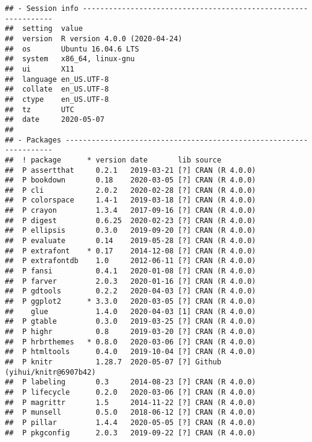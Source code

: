 \documentclass[ngerman,a4paper,]{scrartcl}
\begin{document}
\begin{verbatim}
## - Session info ---------------------------------------------------------------
##  setting  value                       
##  version  R version 4.0.0 (2020-04-24)
##  os       Ubuntu 16.04.6 LTS          
##  system   x86_64, linux-gnu           
##  ui       X11                         
##  language en_US.UTF-8                 
##  collate  en_US.UTF-8                 
##  ctype    en_US.UTF-8                 
##  tz       UTC                         
##  date     2020-05-07                  
## 
## - Packages -------------------------------------------------------------------
##  ! package      * version date       lib source                      
##  P assertthat     0.2.1   2019-03-21 [?] CRAN (R 4.0.0)              
##  P bookdown       0.18    2020-03-05 [?] CRAN (R 4.0.0)              
##  P cli            2.0.2   2020-02-28 [?] CRAN (R 4.0.0)              
##  P colorspace     1.4-1   2019-03-18 [?] CRAN (R 4.0.0)              
##  P crayon         1.3.4   2017-09-16 [?] CRAN (R 4.0.0)              
##  P digest         0.6.25  2020-02-23 [?] CRAN (R 4.0.0)              
##  P ellipsis       0.3.0   2019-09-20 [?] CRAN (R 4.0.0)              
##  P evaluate       0.14    2019-05-28 [?] CRAN (R 4.0.0)              
##  P extrafont    * 0.17    2014-12-08 [?] CRAN (R 4.0.0)              
##  P extrafontdb    1.0     2012-06-11 [?] CRAN (R 4.0.0)              
##  P fansi          0.4.1   2020-01-08 [?] CRAN (R 4.0.0)              
##  P farver         2.0.3   2020-01-16 [?] CRAN (R 4.0.0)              
##  P gdtools        0.2.2   2020-04-03 [?] CRAN (R 4.0.0)              
##  P ggplot2      * 3.3.0   2020-03-05 [?] CRAN (R 4.0.0)              
##    glue           1.4.0   2020-04-03 [1] CRAN (R 4.0.0)              
##  P gtable         0.3.0   2019-03-25 [?] CRAN (R 4.0.0)              
##  P highr          0.8     2019-03-20 [?] CRAN (R 4.0.0)              
##  P hrbrthemes   * 0.8.0   2020-03-06 [?] CRAN (R 4.0.0)              
##  P htmltools      0.4.0   2019-10-04 [?] CRAN (R 4.0.0)              
##  P knitr          1.28.7  2020-05-07 [?] Github (yihui/knitr@6907b42)
##  P labeling       0.3     2014-08-23 [?] CRAN (R 4.0.0)              
##  P lifecycle      0.2.0   2020-03-06 [?] CRAN (R 4.0.0)              
##  P magrittr       1.5     2014-11-22 [?] CRAN (R 4.0.0)              
##  P munsell        0.5.0   2018-06-12 [?] CRAN (R 4.0.0)              
##  P pillar         1.4.4   2020-05-05 [?] CRAN (R 4.0.0)              
##  P pkgconfig      2.0.3   2019-09-22 [?] CRAN (R 4.0.0)              

\end{verbatim}
\end{document}
